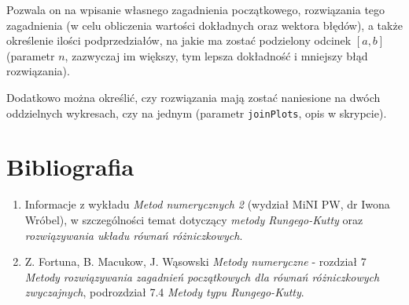 \documentclass[12pt]{article}
\begin{document}
	Pozwala on na wpisanie własnego zagadnienia początkowego, rozwiązania tego zagadnienia (w celu obliczenia wartości dokładnych oraz wektora błędów), a także określenie ilości podprzedziałów, na jakie ma zostać podzielony odcinek $[a, b]$ (parametr $n$, zazwyczaj im większy, tym lepsza dokładność i mniejszy błąd rozwiązania).
	
	Dodatkowo można określić, czy rozwiązania mają zostać naniesione na dwóch oddzielnych wykresach, czy na jednym (parametr \texttt{joinPlots}, opis w skrypcie).
	
	
	\section{Bibliografia}
	\begin{enumerate}
		\item Informacje z wykładu \textit{Metod numerycznych 2} (wydział MiNI PW, dr Iwona Wróbel), w szczególności temat dotyczący \textit{metody Rungego-Kutty} oraz \textit{rozwiązywania układu równań różniczkowych}.
		\item Z. Fortuna, B. Macukow, J. Wąsowski \textit{Metody numeryczne} - rozdział 7 \textit{Metody rozwiązywania zagadnień początkowych dla równań różniczkowych zwyczajnych}, podrozdział 7.4 \textit{Metody typu Rungego-Kutty}.
	\end{enumerate}
	
\end{document}
